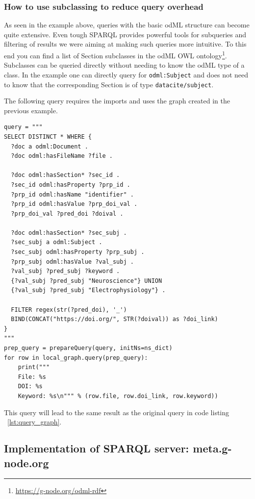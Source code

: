 \documentclass{article}
\begin{document}
\subsubsection{How to use subclassing to reduce query overhead} \label{sec:rdf_subclass_usage}

As seen in the example above, queries with the basic odML structure can become quite extensive. Even tough SPARQL provides powerful tools for subqueries and filtering of results we were aiming at making such queries more intuitive. To this end you can find a list of Section subclasses in the odML OWL ontology\footnote{\url{https://g-node.org/odml-rdf}}. Subclasses can be queried directly without needing to know the odML type of a class. In the example one can directly query for \texttt{odml:Subject} and does not need to know that the corresponding Section is of type \texttt{datacite/subject}.

The following query requires the imports and uses the graph created in the previous example.

\begin{lstlisting}[label=lst:query_graph_subclass, caption=Subclass query example, basicstyle=\small]
query = """
SELECT DISTINCT * WHERE {
  ?doc a odml:Document .
  ?doc odml:hasFileName ?file .

  ?doc odml:hasSection* ?sec_id .
  ?sec_id odml:hasProperty ?prp_id .
  ?prp_id odml:hasName "identifier" .
  ?prp_id odml:hasValue ?prp_doi_val .
  ?prp_doi_val ?pred_doi ?doival .

  ?doc odml:hasSection* ?sec_subj .
  ?sec_subj a odml:Subject .
  ?sec_subj odml:hasProperty ?prp_subj .
  ?prp_subj odml:hasValue ?val_subj .
  ?val_subj ?pred_subj ?keyword .
  {?val_subj ?pred_subj "Neuroscience"} UNION
  {?val_subj ?pred_subj "Electrophysiology"} .

  FILTER regex(str(?pred_doi), '_')
  BIND(CONCAT("https://doi.org/", STR(?doival)) as ?doi_link)
}
"""
prep_query = prepareQuery(query, initNs=ns_dict)
for row in local_graph.query(prep_query):
    print("""
    File: %s
    DOI: %s
    Keyword: %s\n""" % (row.file, row.doi_link, row.keyword))
\end{lstlisting}

This query will lead to the same result as the original query in code listing ~\ref{lst:query_graph}.

\subsection{Implementation of SPARQL server: meta.g-node.org} \label{sec:odml_query}
\end{document}
